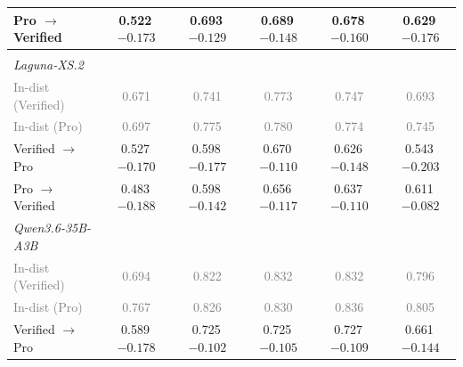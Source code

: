 \begin{table}[t]
\begin{tabular}{lccccc}
\qquad{}Pro $\rightarrow$ Verified & 0.522\,{\scriptsize \textcolor{red!70!black}{$-0.173$}} & 0.693\,{\scriptsize \textcolor{red!70!black}{$-0.129$}} & 0.689\,{\scriptsize \textcolor{red!70!black}{$-0.148$}} & 0.678\,{\scriptsize \textcolor{red!70!black}{$-0.160$}} & 0.629\,{\scriptsize \textcolor{red!70!black}{$-0.176$}}  \\
\midrule
\multicolumn{6}{l}{\textit{\RedFail{}}} \\
\quad{}\textit{Laguna-XS.2} \\
\qquad{}\textcolor{gray}{\small In-dist (Verified)} & \textcolor{gray}{\small 0.671} & \textcolor{gray}{\small 0.741} & \textcolor{gray}{\small 0.773} & \textcolor{gray}{\small 0.747} & \textcolor{gray}{\small 0.693} \\
\qquad{}\textcolor{gray}{\small In-dist (Pro)} & \textcolor{gray}{\small 0.697} & \textcolor{gray}{\small 0.775} & \textcolor{gray}{\small 0.780} & \textcolor{gray}{\small 0.774} & \textcolor{gray}{\small 0.745} \\
\qquad{}Verified $\rightarrow$ Pro & 0.527\,{\scriptsize \textcolor{red!70!black}{$-0.170$}} & 0.598\,{\scriptsize \textcolor{red!70!black}{$-0.177$}} & 0.670\,{\scriptsize \textcolor{red!70!black}{$-0.110$}} & 0.626\,{\scriptsize \textcolor{red!70!black}{$-0.148$}} & 0.543\,{\scriptsize \textcolor{red!70!black}{$-0.203$}}  \\
\qquad{}Pro $\rightarrow$ Verified & 0.483\,{\scriptsize \textcolor{red!70!black}{$-0.188$}} & 0.598\,{\scriptsize \textcolor{red!70!black}{$-0.142$}} & 0.656\,{\scriptsize \textcolor{red!70!black}{$-0.117$}} & 0.637\,{\scriptsize \textcolor{red!70!black}{$-0.110$}} & 0.611\,{\scriptsize \textcolor{red!70!black}{$-0.082$}}  \\
\quad{}\textit{Qwen3.6-35B-A3B} \\
\qquad{}\textcolor{gray}{\small In-dist (Verified)} & \textcolor{gray}{\small 0.694} & \textcolor{gray}{\small 0.822} & \textcolor{gray}{\small 0.832} & \textcolor{gray}{\small 0.832} & \textcolor{gray}{\small 0.796} \\
\qquad{}\textcolor{gray}{\small In-dist (Pro)} & \textcolor{gray}{\small 0.767} & \textcolor{gray}{\small 0.826} & \textcolor{gray}{\small 0.830} & \textcolor{gray}{\small 0.836} & \textcolor{gray}{\small 0.805} \\
\qquad{}Verified $\rightarrow$ Pro & 0.589\,{\scriptsize \textcolor{red!70!black}{$-0.178$}} & 0.725\,{\scriptsize \textcolor{red!70!black}{$-0.102$}} & 0.725\,{\scriptsize \textcolor{red!70!black}{$-0.105$}} & 0.727\,{\scriptsize \textcolor{red!70!black}{$-0.109$}} & 0.661\,{\scriptsize \textcolor{red!70!black}{$-0.144$}}  \\

\end{tabular}
\end{table}
